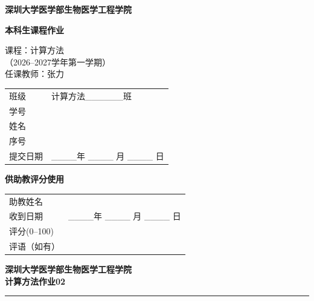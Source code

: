 \documentclass[a4paper,11pt]{ctexart}
\begin{document}
\begin{titlepage}
  \centering
  {\bfseries 深圳大学医学部生物医学工程学院\par}
  \vspace{1.2em}
  {\bfseries 本科生课程作业\par}
  \vspace{2.5em}
  {
    课程：计算方法\\
    （2026--2027学年第一学期）\\
    任课教师：张力\par}
  \vspace{2.5em}

  {
  \renewcommand{\arraystretch}{1.6}
  \begin{tabular}{p{5.5em}p{15.5em}}
    班级 & 计算方法\_\_\_\_\_\_班 \\[0.4em]
    学号 & \\[0.4em]
    姓名 & \\[0.4em]
    序号 & \\[0.4em]
    提交日期 & \_\_\_\_年 \_\_\_\_ 月 \_\_\_\_ 日 \\
  \end{tabular}
  \par}

  \vspace{2.5em}
  {\bfseries 供助教评分使用\par}
  \vspace{1em}
  {
  \renewcommand{\arraystretch}{1.6}
  \begin{tabular}{p{7em}p{14em}}
    助教姓名 & \\[0.4em]
    收到日期 & \_\_\_\_年 \_\_\_\_ 月 \_\_\_\_ 日 \\[0.4em]
    评分(0--100) & \\[0.4em]
    评语（如有） & \\[0.4em]
  \end{tabular}
  \par}
\end{titlepage}

\begin{center}
  {\bfseries 深圳大学\quad 医学部\quad 生物医学工程学院}\\[0.6em]
  {\bfseries 计算方法\quad 作业02}
\end{center}
\vspace{-0.3em}
\noindent\rule{\textwidth}{0.8pt}
\vspace{0.3em}
\end{document}
